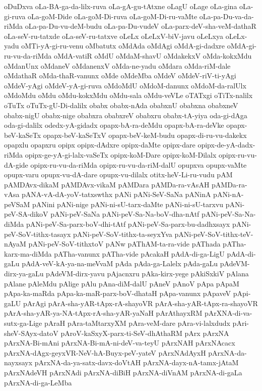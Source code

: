 {oDuDxva
oLa-BA-ga-da-lilx-ruva
oLa-gA-gu-tAtxne
oLagU
oLage
oLa-gina
oLa-gi-ruva
oLa-goM-Dide
oLa-goM-Di-ruva
oLa-goM-Di-ru-vaMte
oLa-pa-Du-va-da-riMda
oLa-pa-Du-vu-deM-budu
oLa-pa-Du-vudeV
oLa-parx-deV-sha-veM-dathaR
oLa-seV-ru-tatxde
oLa-seV-ru-tatxve
oLeLx
oLeLxV-biV-javu
oLeLxya
oLeLx-yadu
oMTi-yA-gi-ru-venu
oMbatutx
oMdAda
oMdAgi
oMdA-gi-dadxre
oMdA-gi-ru-vu-da-riMda
oMdA-vatiR
oMdU
oMdaM-shavU
oMdakekxV
oMda-kokxMdu
oMdanUnx
oMdaneV
oMdanenxV
oMda-ne-yadu
oMdara
oMda-riM-dale
oMdathaR
oMda-thaR-vanunx
oMde
oMdeMba
oMdeV
oMdeV-riV-ti-yAgi
oMdeV-yAgi
oMdeV-yA-gi-ruva
oMdoMdU
oMdoM-danunx
oMdoM-da-ralUlx
oMdoMdu
oMdu
oMdu-kokxMdu
oMdu-sala
oMdu-veVLe
oTATxgi
oTiTx-nalilx
oTuTx
oTuTx-gU-Di-dalilx
obabx
obabx-nAda
obabxnU
obabxna
obabxneV
obabx-nigU
obabx-nige
obabxra
obabxreV
obabxru
obabx-tA-yiya
oda-gi-dAga
oda-gi-dalilx
odedx-yA-gidadx
opapx-bA-ra-deMdu
opapx-bA-ra-deVke
opapx-beV-kaSeTx
opapx-beV-kaSeTxV
opapx-beV-keM-budu
opapx-di-ru-vu-dakekx
opapxlu
opapxru
opipx
opipx-dAdxre
opipx-daMte
opipx-dare
opipx-de-yA-dadx-riMda
opipx-ge-yA-gi-lalx-vaSeTx
opipx-koM-Dare
opipx-koM-Dilalx
opipx-ru-vu-dA-gide
opipx-ru-vu-da-riMda
opipx-ru-vu-da-riM-dalU
opupxva
opupx-vaMte
opupx-varu
opupx-vu-dA-dare
opupx-vu-dilalx
otitx-heV-Li-ru-vudu
pAM
pAMDAvx-dikaM
pAMDAvx-vikaM
pAMDara
pAMDa-ra-vAsAH
pAMDa-ra-vAsa
pANA-vA-dA-yoV-tatxswthx
pANi
pANi-SeV-SaNa
pANinA
pANi-nA-peVSaM
pANini
pANi-nige
pANi-ni-sU-tarx-daMte
pANi-ni-sU-tarxvu
pANi-peV-SA-dikoV
pANi-peV-SaNa
pANi-peV-Sa-Na-boV-dha-nAtf
pANi-peV-Sa-Na-diMda
pANi-peV-Sa-parx-boV-dhi-tAtf
pANi-peV-Sa-parx-bu-dadhxsayx
pANi-peV-SoV-tithx-tasayx
pANi-peV-SoV-tithx-ta-seyxYva
pANi-peV-SoV-tithx-teV-nAyaM
pANi-peV-SoV-tithxtoV
pANw
pAThAM-ta-ra-vide
pAThada
pATha-karx-ma-diMda
pATha-vanunx
pATha-vide
pAcakaH
pAdA-di-ga-LigU
pAdA-di-gaLu
pAdA-veV-kA-ya-na-meVvaM
pAda
pAda-ga-Lalelx
pAda-gaLu
pAdeVM-dirx-ya-gaLu
pAdeVM-dirx-yavu
pAjacnxru
pAka-kirx-yege
pAkiSxkiV
pAlana
pAlane
pAleMdu
pAlige
pAlu
pAna-diM-dalU
pAneV
pAnoV
pApa
pApaM
pApa-ka-maRda
pApa-ka-maR-parx-boV-dhataH
pApa-vanunx
pApaveV
pApi-gaLU
pArAgi
pArA-sha-yAR-tApx-rA-shayoVR
pArA-sha-yAR-tApx-ra-shayoVR
pArA-sha-yAR-ya-NA-tApx-rA-sha-yAR-yaNaH
pArAthayxRM
pArXNA-di-va-sutx-ga-Lige
pAraH
pAra-taMtarxyXM
pAra-veM-dare
pAra-vi-lalxdudx
pAri-sheV-SAyx-datoV
pAroV-kaSxyX-parx-ti-SeV-dhAthaRM
pArx
pArxNA
pArxNA-Bi-mAni
pArxNA-Bi-mA-ni-deV-va-teyU
pArxNAH
pArxNAcacx
pArxNA-dAgx-geyxVR-NeV-hA-Buyx-peV-yateV
pArxNAdAyxH
pArxNA-da-nayxsayx
pArxNA-da-ya-satx-davx-doVtAH
pArxNA-dayx-nA-tamx-jAtaM
pArxNAdeVH
pArxNAdi
pArxNA-diBiH
pArxNA-diVnAM
pArxNA-di-gaLa
pArxNA-di-ga-LeMba
}
